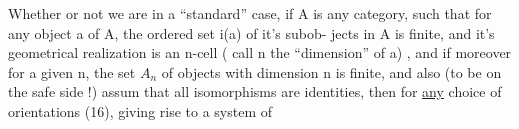 Whether or not we are in a ``standard'' case,  if A is any category,
such that for any object a of A,  the ordered set i(a)  of it's subob-%
jects in A  is finite,  and it's geometrical realization is an n-cell
( call n the ``dimension'' of a) ,  and if moreover for a given n,  the
set $A_n$ of objects with dimension n is finite,  and also (to be on the
safe side !)   assum that all isomorphisms are identities,  then
for \uline{any} choice  of orientations (16),  giving rise to a system of


